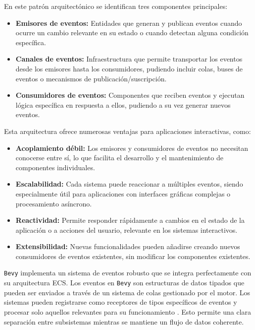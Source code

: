 En este patrón arquitectónico se identifican tres componentes principales:
\begin{itemize}
    \item \textbf{Emisores de eventos:} Entidades que generan y publican eventos cuando ocurre un cambio relevante en su estado o cuando detectan alguna condición específica.
    
    \item \textbf{Canales de eventos:} Infraestructura que permite transportar los eventos desde los emisores hasta los consumidores, pudiendo incluir colas, buses de eventos o mecanismos de publicación/suscripción.
    
    \item \textbf{Consumidores de eventos:} Componentes que reciben eventos y ejecutan lógica específica en respuesta a ellos, pudiendo a su vez generar nuevos eventos.
\end{itemize}

Esta arquitectura ofrece numerosas ventajas para aplicaciones interactivas, como:

\begin{itemize}
    \item \textbf{Acoplamiento débil:} Los emisores y consumidores de eventos no necesitan conocerse entre sí, lo que facilita el desarrollo y el mantenimiento de componentes individuales.
    
    \item \textbf{Escalabilidad:} Cada sistema puede reaccionar a múltiples eventos, siendo especialmente útil para aplicaciones con interfaces gráficas complejas o procesamiento asíncrono.
    
    \item \textbf{Reactividad:} Permite responder rápidamente a cambios en el estado de la aplicación o a acciones del usuario, relevante en los sistemas interactivos.
    
    \item \textbf{Extensibilidad:} Nuevas funcionalidades pueden añadirse creando nuevos consumidores de eventos existentes, sin modificar los componentes existentes.
\end{itemize}

\texttt{Bevy} implementa un sistema de eventos robusto que se integra perfectamente con su arquitectura \ac{ECS}. Los eventos en \texttt{Bevy} son estructuras de datos tipados que pueden ser enviados a través de un sistema de colas gestionado por el motor. Los sistemas pueden registrarse como receptores de tipos específicos de eventos y procesar solo aquellos relevantes para su funcionamiento \autocite{EventsBevyPrelude,EventsUnofficialBevy}. Esto permite una clara separación entre subsistemas mientras se mantiene un flujo de datos coherente.

